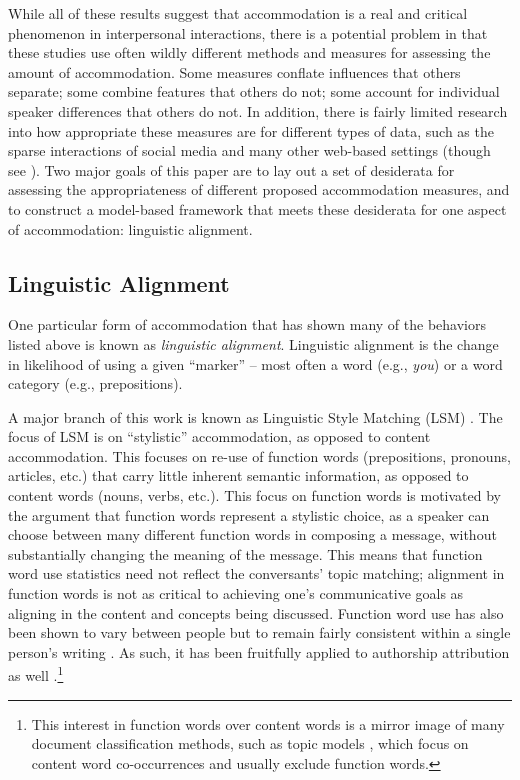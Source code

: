 \documentclass{acm_proc_article-sp}
\begin{document}
While all of these results suggest that accommodation is a real and critical phenomenon in interpersonal interactions, there is a potential problem in that these studies use often wildly different methods and measures for assessing the amount of accommodation. Some measures conflate influences that others separate; some combine features that others do not; some account for individual speaker differences that others do not. In addition, there is fairly limited research into how appropriate these measures are for different types of data, such as the sparse interactions of social media and many other web-based settings (though see \cite{XuReitter2015}).  Two major goals of this paper are to lay out a set of desiderata for assessing the appropriateness of different proposed accommodation measures, and to construct a model-based framework that meets these desiderata for one aspect of accommodation: linguistic alignment.

\subsection{Linguistic Alignment}
One particular form of accommodation that has shown many of the behaviors listed above is known as \textit{linguistic alignment}. Linguistic alignment is the change in likelihood of using a given ``marker'' -- most often a word (e.g., \textit{you}) or a word category (e.g., prepositions).

A major branch of this work is known as Linguistic Style Matching (LSM) \cite{NiederhofferPennebaker2002,IrelandEtAl2011}.  The focus of LSM is on ``stylistic'' accommodation, as opposed to content accommodation.  This focuses on re-use of function words (prepositions, pronouns, articles, etc.) that carry little inherent semantic information, as opposed to content words (nouns, verbs, etc.).  This focus on function words is motivated by the argument that function words represent a stylistic choice, as a speaker can choose between many different function words in composing a message, without substantially changing the meaning of the message.  This means that function word use statistics need not reflect the conversants' topic matching; alignment in function words is not as critical to achieving one's communicative goals as aligning in the content and concepts being discussed.  Function word use has also been shown to vary between people but to remain fairly consistent within a single person's writing \cite{PennebakerKing1999}. As such, it has been fruitfully applied to authorship attribution as well \cite{?}.\footnote{This interest in function words over content words is a mirror image of many document classification methods, such as topic models \cite{BleiNgJordan2003}, which focus on content word co-occurrences and usually exclude function words.}
\end{document}
